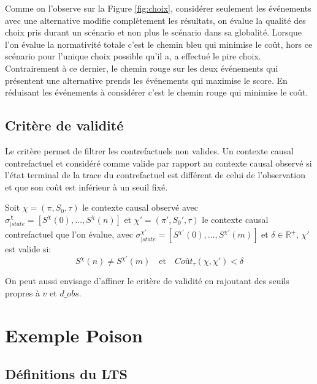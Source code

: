 \documentclass[11pt]{extarticle}
\begin{document}
 Comme on l'observe sur la Figure \ref{fig:choix}, considérer seulement les événements avec une alternative modifie complètement les résultats, on évalue la qualité des choix pris durant un scénario et non plus le scénario dans sa globalité. Lorsque l'on évalue la normativité totale c'est le chemin bleu qui minimise le coût, hors ce scénario pour l'unique choix possible qu'il a, a effectué le pire choix. Contrairement à ce dernier, le chemin rouge sur les deux événements qui présentent une alternative prends les événements qui maximise le score. En réduisant les événements à considérer c'est le chemin rouge qui minimise le coût.


\subsection{Critère de validité}
Le critère permet de filtrer les contrefactuels non valides. Un contexte causal contrefactuel et considéré comme valide par rapport au contexte causal observé si l'état terminal de la trace du contrefactuel est différent de celui de l'observation et que son coût est inférieur à un seuil fixé.

Soit $\chi= (\pi,S_0,\tau)$ le contexte causal observé avec $\sigma_{|state}^\chi = [S^\chi(0),\dots,S^\chi(n)]$ et $\chi'= (\pi',S_0',\tau)$ le contexte causal contrefactuel que l'on évalue, avec $\sigma_{|state}^{\chi'} = [S^{\chi'}(0),\dots,S^{\chi'}(m)]$ et $\delta \in \mathds{R}^+$, $\chi'$ est valide si:
\begin{equation}
    S^\chi(n) \neq S^{\chi'}(m) \quad \text{et} \quad \textit{Coût}_\tau(\chi,\chi')<\delta
\end{equation}

On peut aussi envisage d'affiner le critère de validité en rajoutant des seuils propres à $v$ et $d\_obs$.

\section{Exemple Poison}

\subsection{Définitions du LTS}
\end{document}
